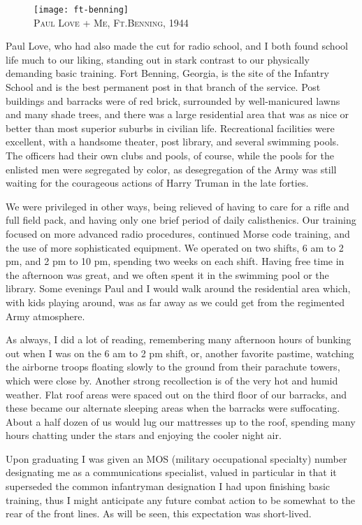 \documentclass[../m3y]{subfiles}
\begin{document}
\begin{figure}
\centering
\texttt{[image: ft-benning]}\\
\medskip
{\newtimes\textsc{Paul Love + Me, Ft.\thinspace{}Benning, 1944}}
\end{figure}

Paul Love, who had also made the cut for radio school, and I both found school life much to our liking, standing out in stark contrast to our physically demanding basic training. Fort Benning, Georgia, is the site of the Infantry School and is the best permanent post in that branch of the service. Post buildings and barracks were of red brick, surrounded by well-manicured lawns and many shade trees, and there was a large residential area that was as nice or better than most superior suburbs in civilian life. Recreational facilities were excellent, with a handsome theater, post library, and several swimming pools. The officers had their own clubs and pools, of course, while the pools for the enlisted men were segregated by color, as desegregation of the Army was still waiting for the courageous actions of Harry Truman in the late forties.

We were privileged in other ways, being relieved of having to care for a rifle and full field pack, and having only one brief period of daily calisthenics. Our training focused on more advanced radio procedures, continued Morse code training, and the use of more sophisticated equipment. We operated on two shifts, 6 am to 2 pm, and 2 pm to 10 pm, spending two weeks on each shift. Having free time in the afternoon was great, and we often spent it in the swimming pool or the library. Some evenings Paul and I would walk around the residential area which, with kids playing around, was as far away as we could get from the regimented Army atmosphere.

As always, I did a lot of reading, remembering many afternoon hours of bunking out when I was on the 6 am to 2 pm shift, or, another favorite pastime, watching the airborne troops floating slowly to the ground from their parachute towers, which were close by. Another strong recollection is of the very hot and humid weather. Flat roof areas were spaced out on the third floor of our barracks, and these became our alternate sleeping areas when the barracks were suffocating. About a half dozen of us would lug our mattresses up to the roof, spending many hours chatting under the stars and enjoying the cooler night air.

Upon graduating I was given an MOS (military occupational specialty) number designating me as a communications specialist, valued in particular in that it superseded the common infantryman designation I had upon finishing basic training, thus I might anticipate any future combat action to be somewhat to the rear of the front lines. As will be seen, this expectation was short-lived.
\end{document}
